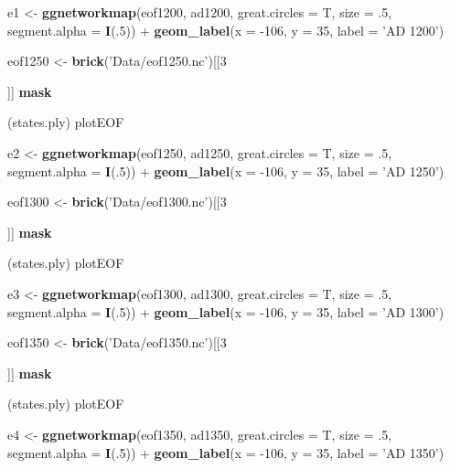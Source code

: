 \documentclass[]{article}
\newenvironment{Shaded}{\begin{snugshade}}{\end{snugshade}}
\newcommand{\KeywordTok}[1]{\textcolor[rgb]{0.13,0.29,0.53}{\textbf{{#1}}}}
\newcommand{\DataTypeTok}[1]{\textcolor[rgb]{0.13,0.29,0.53}{{#1}}}
\newcommand{\DecValTok}[1]{\textcolor[rgb]{0.00,0.00,0.81}{{#1}}}
\newcommand{\StringTok}[1]{\textcolor[rgb]{0.31,0.60,0.02}{{#1}}}
\newcommand{\NormalTok}[1]{{#1}}
\begin{document}
\begin{Shaded}
\begin{Highlighting}[]
\NormalTok{e1 <-}\StringTok{ }\KeywordTok{ggnetworkmap}\NormalTok{(eof1200, ad1200, }\DataTypeTok{great.circles =} \NormalTok{T, }\DataTypeTok{size =} \NormalTok{.}\DecValTok{5}\NormalTok{, }\DataTypeTok{segment.alpha =} \KeywordTok{I}\NormalTok{(.}\DecValTok{5}\NormalTok{)) +}\StringTok{ }\KeywordTok{geom_label}\NormalTok{(}\DataTypeTok{x =} \NormalTok{-}\DecValTok{106}\NormalTok{, }\DataTypeTok{y =} \DecValTok{35}\NormalTok{, }\DataTypeTok{label =} \StringTok{'AD 1200'}\NormalTok{)}

  
\NormalTok{eof1250 <-}\StringTok{ }\KeywordTok{brick}\NormalTok{(}\StringTok{'Data/eof1250.nc'}\NormalTok{)[[}\DecValTok{3}\NormalTok{]] %
\StringTok{  }\KeywordTok{mask}\NormalTok{(states.ply) %
\StringTok{    }\NormalTok{plotEOF}


\NormalTok{e2 <-}\StringTok{ }\KeywordTok{ggnetworkmap}\NormalTok{(eof1250, ad1250, }\DataTypeTok{great.circles =} \NormalTok{T, }\DataTypeTok{size =} \NormalTok{.}\DecValTok{5}\NormalTok{, }\DataTypeTok{segment.alpha =} \KeywordTok{I}\NormalTok{(.}\DecValTok{5}\NormalTok{)) +}\StringTok{  }\KeywordTok{geom_label}\NormalTok{(}\DataTypeTok{x =} \NormalTok{-}\DecValTok{106}\NormalTok{, }\DataTypeTok{y =} \DecValTok{35}\NormalTok{, }\DataTypeTok{label =} \StringTok{'AD 1250'}\NormalTok{)}

\NormalTok{eof1300 <-}\StringTok{ }\KeywordTok{brick}\NormalTok{(}\StringTok{'Data/eof1300.nc'}\NormalTok{)[[}\DecValTok{3}\NormalTok{]] %
\StringTok{  }\KeywordTok{mask}\NormalTok{(states.ply) %
\StringTok{    }\NormalTok{plotEOF}

\NormalTok{e3 <-}\StringTok{ }\KeywordTok{ggnetworkmap}\NormalTok{(eof1300, ad1300, }\DataTypeTok{great.circles =} \NormalTok{T, }\DataTypeTok{size =} \NormalTok{.}\DecValTok{5}\NormalTok{, }\DataTypeTok{segment.alpha =} \KeywordTok{I}\NormalTok{(.}\DecValTok{5}\NormalTok{)) +}\StringTok{ }\KeywordTok{geom_label}\NormalTok{(}\DataTypeTok{x =} \NormalTok{-}\DecValTok{106}\NormalTok{, }\DataTypeTok{y =} \DecValTok{35}\NormalTok{, }\DataTypeTok{label =} \StringTok{'AD 1300'}\NormalTok{)}

\NormalTok{eof1350 <-}\StringTok{ }\KeywordTok{brick}\NormalTok{(}\StringTok{'Data/eof1350.nc'}\NormalTok{)[[}\DecValTok{3}\NormalTok{]] %
\StringTok{  }\KeywordTok{mask}\NormalTok{(states.ply) %
\StringTok{    }\NormalTok{plotEOF}

\NormalTok{e4 <-}\StringTok{ }\KeywordTok{ggnetworkmap}\NormalTok{(eof1350, ad1350, }\DataTypeTok{great.circles =} \NormalTok{T, }\DataTypeTok{size =} \NormalTok{.}\DecValTok{5}\NormalTok{, }\DataTypeTok{segment.alpha =} \KeywordTok{I}\NormalTok{(.}\DecValTok{5}\NormalTok{)) +}\StringTok{ }\KeywordTok{geom_label}\NormalTok{(}\DataTypeTok{x =} \NormalTok{-}\DecValTok{106}\NormalTok{, }\DataTypeTok{y =} \DecValTok{35}\NormalTok{, }\DataTypeTok{label =} \StringTok{'AD 1350'}\NormalTok{)}

}}}}}}
\end{Highlighting}
\end{Shaded}
\end{document}
